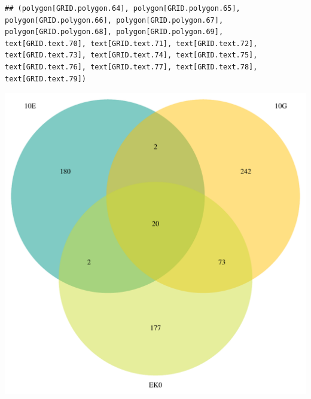 \documentclass{article}\usepackage[]{graphicx}\usepackage[]{color}
\makeatletter
\newenvironment{kframe}{%
 \def\at@end@of@kframe{}%
 \ifinner\ifhmode%
  \def\at@end@of@kframe{\end{minipage}}%
  \begin{minipage}{\columnwidth}%
 \fi\fi%
 \def\FrameCommand##1{\hskip\@totalleftmargin \hskip-\fboxsep
 \colorbox{shadecolor}{##1}\hskip-\fboxsep
     \hskip-\linewidth \hskip-\@totalleftmargin \hskip\columnwidth}%
 \MakeFramed {\advance\hsize-\width
   \@totalleftmargin\z@ \linewidth\hsize
   \@setminipage}}%
 {\par\unskip\endMakeFramed%
 \at@end@of@kframe}
\newenvironment{knitrout}{}{} %
\makeatother
\begin{document}
\begin{knitrout}
\color{fgcolor}\begin{kframe}
\begin{verbatim}
## (polygon[GRID.polygon.64], polygon[GRID.polygon.65], polygon[GRID.polygon.66], polygon[GRID.polygon.67], polygon[GRID.polygon.68], polygon[GRID.polygon.69], text[GRID.text.70], text[GRID.text.71], text[GRID.text.72], text[GRID.text.73], text[GRID.text.74], text[GRID.text.75], text[GRID.text.76], text[GRID.text.77], text[GRID.text.78], text[GRID.text.79])
\end{verbatim}
\end{kframe}

{\centering \includegraphics[width=1\linewidth,height=.4\textheight]{figure/minimal-venn_t2_3fc_up_venn-1} 

}



\end{knitrout}
\end{document}
